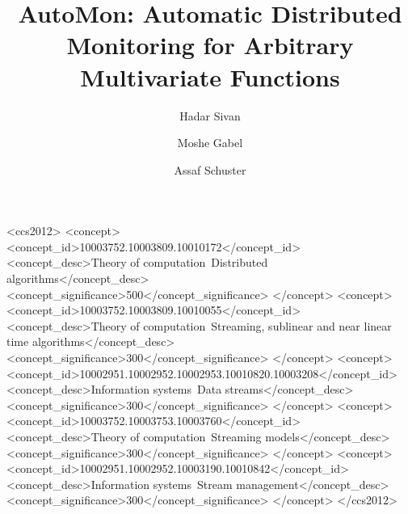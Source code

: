 \documentclass[sigconf]{acmart}
\begin{document}
\fancyhead{}

\title{AutoMon: Automatic Distributed Monitoring for Arbitrary Multivariate Functions}


\author{Hadar Sivan}

\author{Moshe Gabel}

\author{Assaf Schuster}




\begin{CCSXML}
<ccs2012>
   <concept>
       <concept_id>10003752.10003809.10010172</concept_id>
       <concept_desc>Theory of computation~Distributed algorithms</concept_desc>
       <concept_significance>500</concept_significance>
       </concept>
   <concept>
       <concept_id>10003752.10003809.10010055</concept_id>
       <concept_desc>Theory of computation~Streaming, sublinear and near linear time algorithms</concept_desc>
       <concept_significance>300</concept_significance>
       </concept>
   <concept>
       <concept_id>10002951.10002952.10002953.10010820.10003208</concept_id>
       <concept_desc>Information systems~Data streams</concept_desc>
       <concept_significance>300</concept_significance>
       </concept>
   <concept>
       <concept_id>10003752.10003753.10003760</concept_id>
       <concept_desc>Theory of computation~Streaming models</concept_desc>
       <concept_significance>300</concept_significance>
       </concept>
   <concept>
       <concept_id>10002951.10002952.10003190.10010842</concept_id>
       <concept_desc>Information systems~Stream management</concept_desc>
       <concept_significance>300</concept_significance>
       </concept>
 </ccs2012>
\end{CCSXML}
\end{document}
